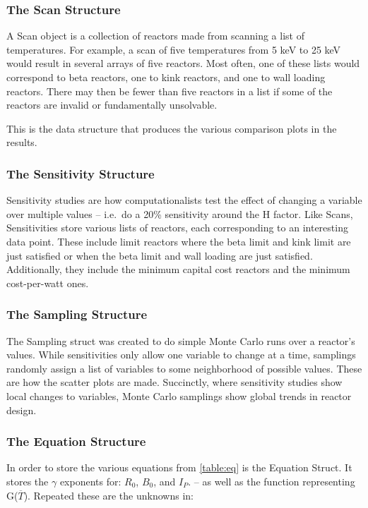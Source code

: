 \subsubsection{The Scan Structure}

A Scan object is a collection of reactors made from scanning a list of temperatures. For example, a scan of five temperatures from 5 keV to 25 keV would result in several arrays of five reactors. Most often, one of these lists would correspond to beta reactors, one to kink reactors, and one to wall loading reactors. There may then be fewer than five reactors in a list if some of the reactors are invalid or fundamentally unsolvable.

This is the data structure that produces the various comparison plots in the results.

\subsubsection{The Sensitivity Structure}

Sensitivity studies are how computationalists test the effect of changing a variable over multiple values -- i.e.\ do a 20\% sensitivity around the H factor. Like Scans, Sensitivities store various lists of reactors, each corresponding to an interesting data point. These include limit reactors where the beta limit and kink limit are just satisfied or when the beta limit and wall loading are just satisfied. Additionally, they include the minimum capital cost reactors and the minimum cost-per-watt ones. 

\subsubsection{The Sampling Structure}

The Sampling struct was created to do simple Monte Carlo runs over a reactor's  values. While sensitivities only allow one variable to change at a time, samplings randomly assign a list of variables to some neighborhood of possible values. These are how the scatter plots are made. Succinctly, where sensitivity studies show local changes to variables, Monte Carlo samplings show global trends in reactor design.

\subsubsection{The Equation Structure}

In order to store the various equations from \cref{table:eq} is the Equation Struct. It stores the $\gamma$ exponents for: $R_0$, $B_0$, and $I_P$. -- as well as the function representing G($\overline T$). Repeated these are the unknowns in:

